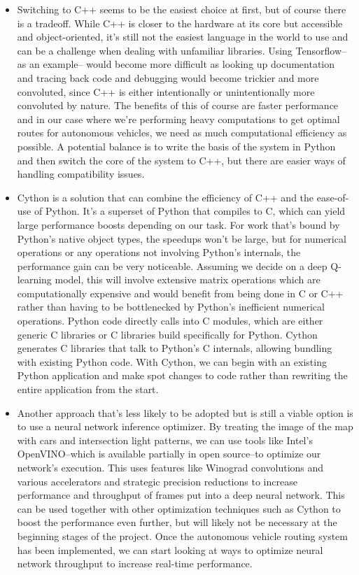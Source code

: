 \documentclass[onecolumn, draftclsnofoot,10pt, compsoc]{IEEEtran}
\begin{document}
\begin{itemize}
\item
Switching to C++ seems to be the easiest choice at first, but of course there is a tradeoff.
While C++ is closer to the hardware at its core but accessible and object-oriented, it's still not the easiest language in the world to use and can be a challenge when dealing with unfamiliar libraries.
Using Tensorflow--as an example-- would become more difficult as looking up documentation and tracing back code and debugging would become trickier and more convoluted, since C++ is either intentionally or unintentionally more convoluted by nature.
The benefits of this of course are faster performance and in our case where we're performing heavy computations to get optimal routes for autonomous vehicles, we need as much computational efficiency as possible.
A potential balance is to write the basis of the system in Python and then switch the core of the system to C++, but there are easier ways of handling compatibility issues.
\item
Cython is a solution that can combine the efficiency of C++ and the ease-of-use of Python.
It's a superset of Python that compiles to C, which can yield large performance boosts depending on our task.
For work that's bound by Python's native object types, the speedups won't be large, but for numerical operations or any operations not involving Python's internals, the performance gain can be very noticeable.
Assuming we decide on a deep Q-learning model, this will involve extensive matrix operations which are computationally expensive and would benefit from being done in C or C++ rather than having to be bottlenecked by Python's inefficient numerical operations.
Python code directly calls into C modules, which are either generic C libraries or C libraries build specifically for Python.
Cython generates C libraries that talk to Python's C internals, allowing bundling with existing Python code.
With Cython, we can begin with an existing Python application and make spot changes to code rather than rewriting the entire application from the start.
\item
Another approach that's less likely to be adopted but is still a viable option is to use a neural network inference optimizer.
By treating the image of the map with cars and intersection light patterns, we can use tools like Intel's OpenVINO--which is available partially in open source--to optimize our network's execution.
This uses features like Winograd convolutions and various accelerators and strategic precision reductions to increase performance and throughput of frames put into a deep neural network.
This can be used together with other optimization techniques such as Cython to boost the performance even further, but will likely not be necessary at the beginning stages of the project.
Once the autonomous vehicle routing system has been implemented, we can start looking at ways to optimize neural network throughput to increase real-time performance.
\end{itemize}
\end{document}
